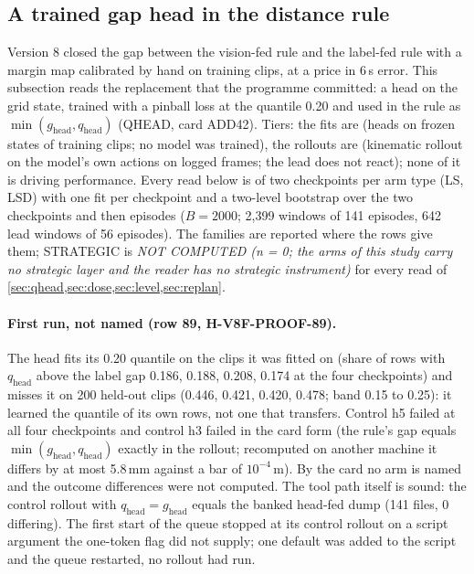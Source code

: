 \subsection{A trained gap head in the distance rule}\label{sec:qhead}
Version 8 closed the gap between the vision-fed rule and the label-fed rule with a margin map calibrated by hand on training clips, at a price in 6\,s error. This subsection reads the replacement that the programme committed: a head on the grid state, trained with a pinball loss at the quantile 0.20 and used in the rule as $\min(g_{\mathrm{head}},q_{\mathrm{head}})$ (QHEAD, card ADD42). Tiers: the fits are  (heads on frozen states of training clips; no model was trained), the rollouts are  (kinematic rollout on the model's own actions on logged frames; the lead does not react); none of it is driving performance. Every read below is of two checkpoints per arm type (LS, LSD) with one fit per checkpoint and a two-level bootstrap over the two checkpoints and then episodes ($B=2000$; 2,399 windows of 141 episodes, 642 lead windows of 56 episodes). The families are reported where the rows give them; STRATEGIC is \emph{NOT COMPUTED (n = 0; the arms of this study carry no strategic layer and the reader has no strategic instrument)} for every read of \cref{sec:qhead,sec:dose,sec:level,sec:replan}.

\paragraph{First run, not named (row 89, H-V8F-PROOF-89).} The head fits its 0.20 quantile on the clips it was fitted on (share of rows with $q_{\mathrm{head}}$ above the label gap 0.186, 0.188, 0.208, 0.174 at the four checkpoints) and misses it on 200 held-out clips (0.446, 0.421, 0.420, 0.478; band 0.15 to 0.25): it learned the quantile of its own rows, not one that transfers. Control h5 failed at all four checkpoints and control h3 failed in the card form (the rule's gap equals $\min(g_{\mathrm{head}},q_{\mathrm{head}})$ exactly in the rollout; recomputed on another machine it differs by at most 5.8\,mm against a bar of $10^{-4}$\,m). By the card no arm is named and the outcome differences were not computed. The tool path itself is sound: the control rollout with $q_{\mathrm{head}}=g_{\mathrm{head}}$ equals the banked head-fed dump (141 files, 0 differing). The first start of the queue stopped at its control rollout on a script argument the one-token flag did not supply; one default was added to the script and the queue restarted, no rollout had run.

